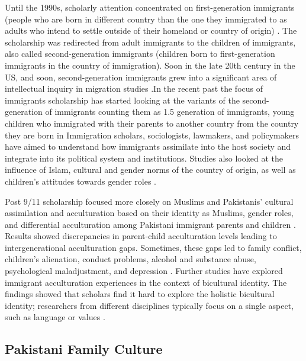 Until the 1990s, scholarly attention concentrated on first-generation immigrants (people who are born in different country than the one they immigrated to as adults who intend to settle outside of their homeland or country of origin) . The scholarship was redirected from adult immigrants to the children of immigrants, also called second-generation immigrants (children born to first-generation immigrants in the country of immigration). Soon in the late 20th century in the US, and soon, second-generation immigrants grew into a significant area of intellectual inquiry in migration studies \citep{zhouGrowingAmericanChallenge1997, zhouDivergentDestiniesChildren2019}.In the recent past the focus of immigrants scholarship has started looking at the variants of the second-generation of immigrants counting them as 1.5 generation of immigrants, young children who immigrated with their parents to another country from the country they are born in \citep{parkLanguageIdentitySense2026}  Immigration scholars, sociologists, lawmakers, and policymakers have aimed to understand how immigrants assimilate into the host society and integrate into its political system and institutions. Studies also looked at the influence of Islam, cultural and gender norms of the country of origin, as well as children’s attitudes towards gender roles \cite{bhatiaTheorizingIdentityTransnational2009, zhouDivergentDestiniesChildren2019}.

 Post 9/11 scholarship focused more closely on Muslims and Pakistanis' cultural assimilation and acculturation based on their identity as Muslims, gender roles, and differential acculturation among Pakistani immigrant parents and children \citep{ngAreMuslimImmigrants2022, aghideh2020a}. Results showed discrepancies in parent-child acculturation levels leading to intergenerational acculturation gaps. Sometimes, these gaps led to family conflict, children’s alienation, conduct problems, alcohol and substance abuse, psychological maladjustment, and depression \citep{khalequeDifferentialAcculturationPakistani2015}. Further studies have explored immigrant acculturation experiences in the context of bicultural identity. The findings showed that scholars find it hard to explore the holistic bicultural identity; researchers from different disciplines typically focus on a single aspect, such as language or values \citep{liuIdentityBiculturalMulticultural2017}.

\subsection{Pakistani Family Culture}

